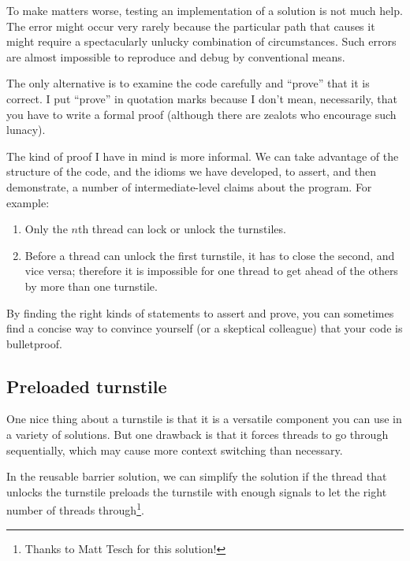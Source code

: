 \documentclass{book}
\newcommand{\clearemptydoublepage}{\newpage\cleardoublepage}
\begin{document}
To make matters worse, testing an implementation of a solution
is not much help.  The error might occur very rarely
because the particular path that causes it might
require a spectacularly unlucky combination of circumstances.
Such errors are almost
impossible to reproduce and debug by conventional means.

The only alternative is to examine the code carefully and
``prove'' that it is correct.  I put ``prove'' in quotation
marks because I don't mean, necessarily, that you have to write
a formal proof (although there are zealots who encourage
such lunacy).

The kind of proof I have in mind is more informal.  We can take
advantage of the structure of the code, and the idioms we have
developed, to assert, and then demonstrate, a number of
intermediate-level claims about the program.  For example:

\begin{enumerate}

\item Only the $n$th thread can lock or unlock the turnstiles.

\item Before a thread can unlock the first turnstile, it has to close 
the second, and vice versa; therefore it is impossible for one thread
to get ahead of the others by more than one turnstile.

\end{enumerate}

By finding the right kinds of statements to assert and
prove, you can sometimes find a concise way to convince yourself
(or a skeptical colleague) that your code is bulletproof.



\clearemptydoublepage
\subsection {Preloaded turnstile}

One nice thing about a turnstile is that it is a versatile
component you can use in a variety of solutions.  But one
drawback is that it forces threads to go through sequentially,
which may cause more context switching than necessary.

In the reusable barrier solution, we can simplify the solution if the
thread that unlocks the turnstile preloads the turnstile with enough
signals to let the right number of threads through\footnote{Thanks to
Matt Tesch for this solution!}.
\end{document}
